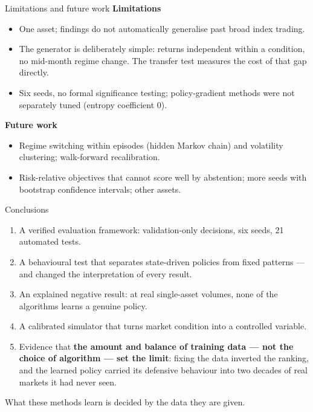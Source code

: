 \documentclass[aspectratio=169,11pt]{beamer}
\begin{document}
\begin{frame}{Limitations and future work}
  \textbf{Limitations}
  \begin{itemize}
    \item One asset; findings do not automatically generalise past
      broad index trading.
    \item The generator is deliberately simple: returns independent
      within a condition, no mid-month regime change. The transfer test
      measures the cost of that gap directly.
    \item Six seeds, no formal significance testing; policy-gradient
      methods were not separately tuned (entropy coefficient 0).
  \end{itemize}
  \vspace{4pt}
  \textbf{Future work}
  \begin{itemize}
    \item Regime switching within episodes (hidden Markov chain) and
      volatility clustering; walk-forward recalibration.
    \item Risk-relative objectives that cannot score well by
      abstention; more seeds with bootstrap confidence intervals;
      other assets.
  \end{itemize}
\end{frame}

\begin{frame}{Conclusions}
  \begin{enumerate}
    \item A verified evaluation framework: validation-only decisions,
      six seeds, 21 automated tests.
    \item A behavioural test that separates state-driven policies from
      fixed patterns --- and changed the interpretation of every
      result.
    \item An explained negative result: at real single-asset volumes,
      none of the algorithms learns a genuine policy.
    \item A calibrated simulator that turns market condition into a
      controlled variable.
    \item Evidence that \textbf{the amount and balance of training
      data --- not the choice of algorithm --- set the limit}: fixing
      the data inverted the ranking, and the learned policy carried its
      defensive behaviour into two decades of real markets it had never
      seen.
  \end{enumerate}
  \vspace{6pt}
  \centering
  What these methods learn is decided by the data they are given.
\end{frame}
\end{document}
